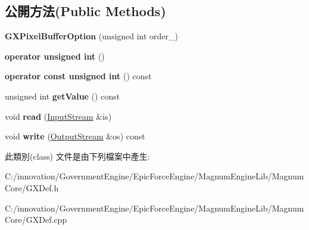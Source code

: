 \subsection*{公開方法(Public Methods)}
\begin{DoxyCompactItemize}
\item 
{\bfseries G\+X\+Pixel\+Buffer\+Option} (unsigned int order\+\_)\hypertarget{class_i_dream_sky_1_1_g_x_pixel_buffer_option_ab462cbb6a87f72f0d1623c1d35f16933}{}\label{class_i_dream_sky_1_1_g_x_pixel_buffer_option_ab462cbb6a87f72f0d1623c1d35f16933}

\item 
{\bfseries operator unsigned int} ()\hypertarget{class_i_dream_sky_1_1_g_x_pixel_buffer_option_a0c15204777297f56d1d17bdf70448a4c}{}\label{class_i_dream_sky_1_1_g_x_pixel_buffer_option_a0c15204777297f56d1d17bdf70448a4c}

\item 
{\bfseries operator const unsigned int} () const \hypertarget{class_i_dream_sky_1_1_g_x_pixel_buffer_option_ac526fb2a5798979e00507faf55e8d9a1}{}\label{class_i_dream_sky_1_1_g_x_pixel_buffer_option_ac526fb2a5798979e00507faf55e8d9a1}

\item 
unsigned int {\bfseries get\+Value} () const \hypertarget{class_i_dream_sky_1_1_g_x_pixel_buffer_option_a609f9c2465d8a5cb27532037e68d26e5}{}\label{class_i_dream_sky_1_1_g_x_pixel_buffer_option_a609f9c2465d8a5cb27532037e68d26e5}

\item 
void {\bfseries read} (\hyperlink{class_i_dream_sky_1_1_input_stream}{Input\+Stream} \&is)\hypertarget{class_i_dream_sky_1_1_g_x_pixel_buffer_option_a28c1cb4691b3c00752429c724b73527d}{}\label{class_i_dream_sky_1_1_g_x_pixel_buffer_option_a28c1cb4691b3c00752429c724b73527d}

\item 
void {\bfseries write} (\hyperlink{class_i_dream_sky_1_1_output_stream}{Output\+Stream} \&os) const \hypertarget{class_i_dream_sky_1_1_g_x_pixel_buffer_option_a2ad50506e90b92c4743b92c77f219105}{}\label{class_i_dream_sky_1_1_g_x_pixel_buffer_option_a2ad50506e90b92c4743b92c77f219105}

\end{DoxyCompactItemize}


此類別(class) 文件是由下列檔案中產生\+:\begin{DoxyCompactItemize}
\item 
C\+:/innovation/\+Government\+Engine/\+Epic\+Force\+Engine/\+Magnum\+Engine\+Lib/\+Magnum\+Core/G\+X\+Def.\+h\item 
C\+:/innovation/\+Government\+Engine/\+Epic\+Force\+Engine/\+Magnum\+Engine\+Lib/\+Magnum\+Core/G\+X\+Def.\+cpp\end{DoxyCompactItemize}
